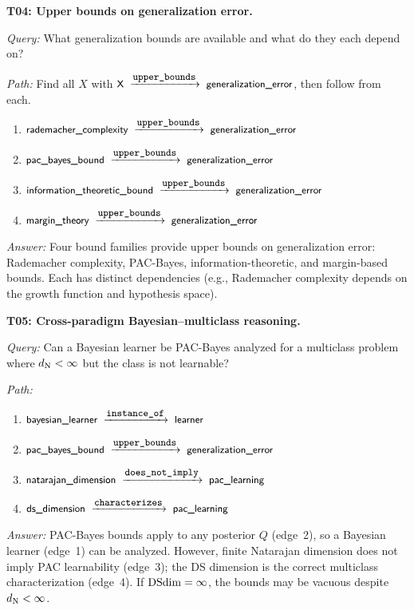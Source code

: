 \begin{traversal}
\textbf{T04: Upper bounds on generalization error.}\par\medskip
\emph{Query:} What generalization bounds are available and what do they each depend on?\par
\emph{Path:} Find all $X$ with $\edge{X}{upper\_bounds}{generalization\_error}$, then follow  from each.\par
\begin{enumerate}[leftmargin=2em, nosep]
  \item $\edge{rademacher\_complexity}{upper\_bounds}{generalization\_error}$ \cite{BartlettMendelson2002}
  \item $\edge{pac\_bayes\_bound}{upper\_bounds}{generalization\_error}$ \cite{McAllester1999}
  \item $\edge{information\_theoretic\_bound}{upper\_bounds}{generalization\_error}$ \cite{XuRaginsky2017}
  \item $\edge{margin\_theory}{upper\_bounds}{generalization\_error}$ \cite{BartlettFosterTelgarsky2017}
\end{enumerate}
\emph{Answer:} Four bound families provide upper bounds on generalization error: Rademacher complexity, PAC-Bayes, information-theoretic, and margin-based bounds. Each has distinct  dependencies (e.g., Rademacher complexity depends on the growth function and hypothesis space).
\end{traversal}

\begin{traversal}
\textbf{T05: Cross-paradigm Bayesian--multiclass reasoning.}\par\medskip
\emph{Query:} Can a Bayesian learner be PAC-Bayes analyzed for a multiclass problem where $d_{\mathrm{N}} < \infty$ but the class is not learnable?\par
\emph{Path:}\par
\begin{enumerate}[leftmargin=2em, nosep]
  \item $\edge{bayesian\_learner}{instance\_of}{learner}$
  \item $\edge{pac\_bayes\_bound}{upper\_bounds}{generalization\_error}$
  \item $\edge{natarajan\_dimension}{does\_not\_imply}{pac\_learning}$
  \item $\edge{ds\_dimension}{characterizes}{pac\_learning}$
\end{enumerate}
\emph{Answer:} PAC-Bayes bounds apply to any posterior $Q$ (edge~2), so a Bayesian learner (edge~1) can be analyzed.  However, finite Natarajan dimension does not imply PAC learnability (edge~3); the DS dimension is the correct multiclass characterization (edge~4).  If $\mathrm{DSdim} = \infty$, the bounds may be vacuous despite $d_{\mathrm{N}} < \infty$.
\end{traversal}

